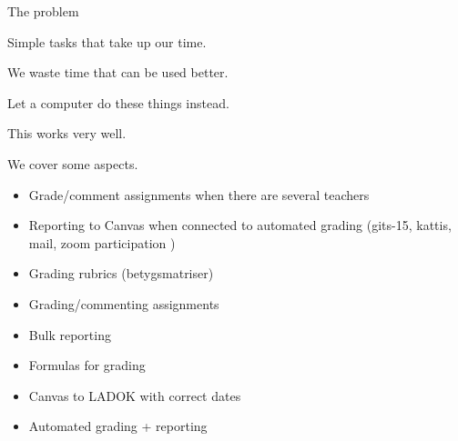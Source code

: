 
\begin{frame}[fragile]
  \begin{block}{The problem}
    \begin{description}
      \item<+>[What's the problem?] Simple tasks that take up our time.
      \item<+>[Why is it a problem?] We waste time that can be used better.
      \item<+>[What's the approach?] Let a computer do these things instead.
      \item<+>[What are the findings?] This works very well.
    \end{description}
  \end{block}
\end{frame}

We cover some aspects.

\begin{frame}[fragile]\label<2>{WishGradingReporting}
  \begin{example}[Grading]
    \begin{itemize}
      \item Grade/comment assignments when there are several teachers
      \item \alert<2>{Reporting to Canvas when connected to automated grading 
        (\eg gits-15, kattis, mail, zoom participation \etc)}
      \item Grading rubrics (betygsmatriser)
      \item \alert<2>{Grading/commenting assignments}
    \end{itemize}
  \end{example}

  \begin{example}[Reporting]
    \begin{itemize}
      \item \alert<2>{Bulk reporting}
      \item \alert<2>{Formulas for grading}
      \item \alert<2>{Canvas to LADOK with correct dates}
      \item \alert<2>{Automated grading + reporting}
    \end{itemize}
  \end{example}
\end{frame}

